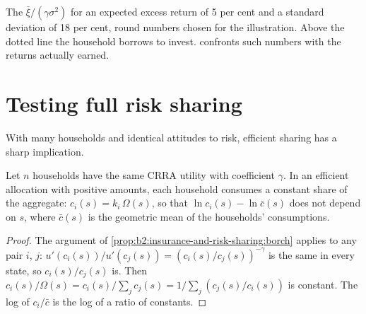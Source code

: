 \begin{omfigure}

{\small The  $\bar\xi/(\gamma\sigma^2)$ for an expected excess return of 5 per cent and a
standard deviation of 18 per cent, round numbers chosen for the illustration. Above the dotted line the
household borrows to invest.  confronts such numbers with the returns
actually earned.}
\end{omfigure}

\section{Testing full risk sharing}\label{sec:b2:insurance-and-risk-sharing:tests}

With many households and identical attitudes to risk, efficient sharing has a sharp implication.

\begin{proposition}\label{prop:b2:insurance-and-risk-sharing:constant-shares}
Let $n$ households have the same CRRA utility with coefficient $\gamma$. In an efficient allocation
with positive amounts, each household consumes a constant share of the aggregate: $c_i(s) =
k_i\,\Omega(s)$, so that $\ln c_i(s) - \ln \bar c(s)$ does not depend on $s$, where $\bar c(s)$ is the
geometric mean of the households' consumptions.
\end{proposition}

\begin{proof}
The argument of \cref{prop:b2:insurance-and-risk-sharing:borch} applies to any pair $i$, $j$:
$u'(c_i(s))/u'(c_j(s)) = (c_i(s)/c_j(s))^{-\gamma}$ is the same in every state, so $c_i(s)/c_j(s)$ is.
Then $c_i(s)/\Omega(s) = c_i(s)/\sum_j c_j(s) = 1/\sum_j (c_j(s)/c_i(s))$ is constant. The log of
$c_i/\bar c$ is the log of a ratio of constants.
\end{proof}

